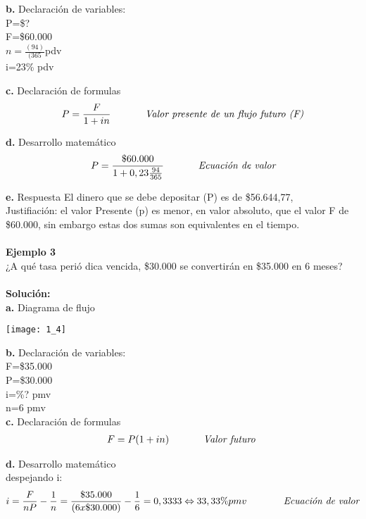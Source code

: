 \textbf{b.} Declaración de variables: \\
P=\$?\\
F=\$60.000\\ 
$n=\frac{(94)}{(365}$pdv \\
i=23\% pdv

\textbf{c.} Declaración de formulas
\begin{align*}
P=\frac{F}{1+in} \hspace{35 pt} \textit{Valor presente de un flujo futuro (F)}
\end{align*}

\textbf{d.} Desarrollo matemático
\begin{align*}
P=\frac{\$60.000}{1+0,23  \frac{94}{365}} \hspace{35 pt} \textit{Ecuación de valor}
\end{align*}

\textbf{e.} Respuesta
El dinero que se debe depositar (P) es de \$56.644,77, \\
Justifiación: el valor Presente (p) es menor, en  valor absoluto, que el valor F de \$60.000, sin embargo estas dos sumas son equivalentes en el tiempo. 
\\\\
\textbf{Ejemplo 3}
\\
¿A qué tasa perió dica vencida, \$30.000 se convertirán en \$35.000 en 6 meses?
\\\\
\textbf{Solución:}
\\
\textbf{a.} Diagrama de flujo
\begin{center}
\texttt{[image: 1\_4]}
\end{center}

\textbf{b.} Declaración de variables: \\

F=\$35.000\\
P=\$30.000 \\
i=\%? pmv\\
n=6 pmv\\


\textbf{c.} Declaración de formulas
\begin{align*}
F=P(1+in) \hspace{35 pt} \textit{Valor futuro }
\end{align*}

\textbf{d.} Desarrollo matemático
\\
despejando i:
\begin{align*}
i=\frac{F}{nP}-\frac{1}{n}=\frac{\$35.000}{(6 x \$30.000)}-\frac{1}{6}=0,3333 \Leftrightarrow 33,33\% pmv \  \hspace{35 pt} \textit{Ecuación de valor}
\end{align*}


